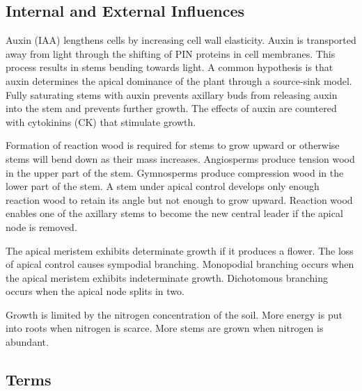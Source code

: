 \documentclass[10pt]{article}
\begin{document}
\subsection{Internal and External Influences}

Auxin (IAA) lengthens cells by increasing cell wall elasticity. Auxin is transported away from light through the shifting of PIN proteins in cell membranes. This process results in stems bending towards light. A common hypothesis is that auxin determines the apical dominance of the plant through a source-sink model. Fully saturating stems with auxin prevents axillary buds from releasing auxin into the stem and prevents further growth. The effects of auxin are countered with cytokinins (CK) that stimulate growth.

Formation of reaction wood is required for stems to grow upward or otherwise stems will bend down as their mass increases. Angiosperms produce tension wood in the upper part of the stem. Gymnosperms produce compression wood in the lower part of the stem. A stem under apical control develops only enough reaction wood to retain its angle but not enough to grow upward. Reaction wood enables one of the axillary stems to become the new central leader if the apical node is removed.

The apical meristem exhibits determinate growth if it produces a flower. The loss of apical control causes sympodial branching. Monopodial branching occurs when the apical meristem exhibits indeterminate growth. Dichotomous branching occurs when the apical node splits in two.

Growth is limited by the nitrogen concentration of the soil. More energy is put into roots when nitrogen is scarce. More stems are grown when nitrogen is abundant.

\subsection{Terms}
\end{document}
